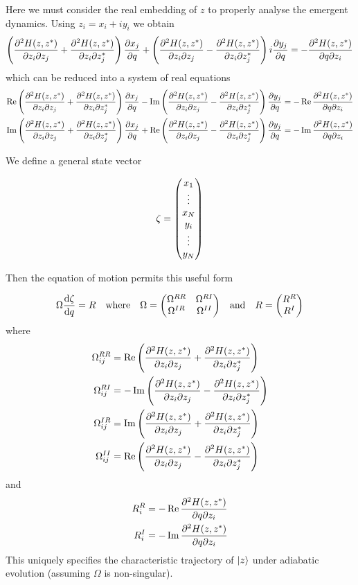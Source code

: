 \documentclass[12pt]{article}
\begin{document}
	Here we must consider the real embedding of $z$ to properly analyse the emergent dynamics. Using $z_i = x_i + iy_i$ we obtain
	\begin{equation}
	\left(\pdv[2]{H(z, z^*)}{z_i}{z_j} + \pdv[2]{H(z, z^*)}{z_i}{z_j^*}\right) \pdv{x_j}{q} + \left(\pdv[2]{H(z, z^*)}{z_i}{z_j} - \pdv[2]{H(z, z^*)}{z_i}{z_j^*}\right) i \pdv{y_j}{q} = -\pdv[2]{H(z, z^*)}{q}{z_i}
	\end{equation}
	which can be reduced into a system of real equations
	\begin{align}
	\Re\left(\pdv[2]{H(z, z^*)}{z_i}{z_j} + \pdv[2]{H(z, z^*)}{z_i}{z_j^*}\right) \pdv{x_j}{q} - \Im\left(\pdv[2]{H(z, z^*)}{z_i}{z_j} - \pdv[2]{H(z, z^*)}{z_i}{z_j^*}\right)\pdv{y_j}{q} &= -\Re\pdv[2]{H(z, z^*)}{q}{z_i}\\
	\Im\left(\pdv[2]{H(z, z^*)}{z_i}{z_j} + \pdv[2]{H(z, z^*)}{z_i}{z_j^*}\right) \pdv{x_j}{q} + \Re\left(\pdv[2]{H(z, z^*)}{z_i}{z_j} - \pdv[2]{H(z, z^*)}{z_i}{z_j^*}\right)\pdv{y_j}{q} &= -\Im\pdv[2]{H(z, z^*)}{q}{z_i}
	\end{align}
	
	We define a general state vector
	
	\begin{equation}
	\zeta = \mqty(x_1 \\ \vdots \\ x_N \\ y_i \\ \vdots \\ y_N)
	\end{equation}
	
	Then the equation of motion permits this useful form
	
	\begin{equation}
	\Omega \dv{\zeta}{q} = R\qq{where}\Omega = \mqty(\Omega^{RR} & \Omega^{RI} \\ \Omega^{IR} & \Omega^{II})\qq{and}R = \mqty(R^R \\ R^I)
	\end{equation}
	where
	\begin{align}
	\Omega^{RR}_{ij} &= \Re\left(\pdv[2]{H(z, z^*)}{z_i}{z_j} + \pdv[2]{H(z, z^*)}{z_i}{z_j^*}\right)\\
	\Omega^{RI}_{ij} &= - \Im\left(\pdv[2]{H(z, z^*)}{z_i}{z_j} - \pdv[2]{H(z, z^*)}{z_i}{z_j^*}\right)\\
	\Omega^{IR}_{ij} &= \Im\left(\pdv[2]{H(z, z^*)}{z_i}{z_j} + \pdv[2]{H(z, z^*)}{z_i}{z_j^*}\right)\\
	\Omega^{II}_{ij} &= \Re\left(\pdv[2]{H(z, z^*)}{z_i}{z_j} - \pdv[2]{H(z, z^*)}{z_i}{z_j^*}\right)
	\end{align}
	and
	\begin{align}
	R^R_i &= -\Re\pdv[2]{H(z, z^*)}{q}{z_i}\\
	R^I_i &= -\Im\pdv[2]{H(z, z^*)}{q}{z_i}
	\end{align}
	This uniquely specifies the characteristic trajectory of $\ket{z}$ under adiabatic evolution (assuming $\Omega$ is non-singular).
	
\end{document}
